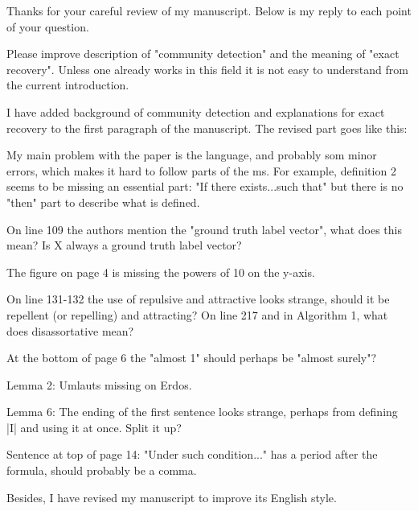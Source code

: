 \documentclass[answers]{exam}
\begin{document}
	\pagestyle{empty}
	Thanks for your careful review of my manuscript. Below is my reply to each point of your question.
\begin{questions}
\question Please improve description of "community detection" and the meaning of "exact recovery". Unless one already works in this field it is not easy to understand from the current introduction.
\begin{solution}
	I have added background of community detection and explanations for exact recovery to the first paragraph of the manuscript.
	The revised part goes like this:
	
\end{solution}
\question My main problem with the paper is the language, and probably som minor errors, which makes it hard to follow parts of the ms. For example, definition 2 seems to be missing an essential part: "If there exists...such that" but there is no "then" part to describe what is defined. 

\question On line 109 the authors mention the "ground truth label vector", what does this mean? Is X always a ground truth label vector? 

\question The figure on page 4 is missing the powers of 10 on the y-axis.

\question On line 131-132 the use of repulsive and attractive looks strange, should it be repellent (or repelling) and attracting? On line 217 and in Algorithm 1, what does disassortative mean?

\question At the bottom of page 6 the "almost 1" should perhaps be "almost surely"?

\question Lemma 2: Umlauts missing on Erdos.

\question Lemma 6: The ending of the first sentence looks strange, perhaps from defining |I| and using it at once. Split it up?

\question Sentence at top of page 14: "Under such condition..." has a period after the formula, should probably be a comma.
\end{questions}
Besides, I have revised my manuscript to improve its English style.
\end{document}
